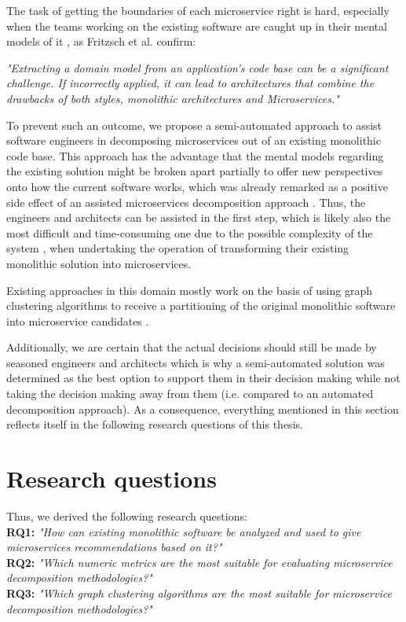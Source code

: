 \documentclass[12pt,a4paper]{report}
\begin{document}
The task of getting the boundaries of each microservice right is hard,
especially when the teams working on the existing software
are caught up in their mental models of it \cite{latoza2006maintaining},
as Fritzsch et al. confirm:
\begin{displayquote}
\emph{"Extracting a domain model from an application's code base
can be a significant challenge. If incorrectly applied,
it can lead to architectures that combine the drawbacks of both styles,
monolithic architectures and Microservices."}~\cite{fritzsch2018monolith}
\end{displayquote}
To prevent such an outcome, we propose a semi-automated approach to assist
software engineers in decomposing microservices out of an existing monolithic code base.
This approach has the advantage that the mental models regarding the existing
solution might be broken apart partially to offer new perspectives onto how
the current software works, which was already remarked as a positive side effect
of an assisted microservices decomposition approach \cite{gysel2016service}.
Thus, the engineers and architects can be assisted in the first step,
which is likely also the most difficult and time-consuming one due to the possible
complexity of the system \cite{fritzsch2018monolith, france2007model},
when undertaking the operation of transforming their existing
monolithic solution into microservices.

Existing approaches in this domain mostly work on the basis of using graph
clustering algorithms to receive a partitioning of the original monolithic
software into microservice candidates \cite{fritzsch2018monolith}.

Additionally, we are certain that the actual decisions should still be made
by seasoned engineers and architects which is why a semi-automated solution
was determined as the best option to support them in their
decision making while not taking the decision making away from them
(i.e. compared to an automated decomposition approach).
As a consequence, everything mentioned in this section reflects itself in
the following research questions of this thesis.



\section{Research questions}

\hangindent=1cm
\noindent Thus, we derived the following research questions:\\
\textbf{RQ1:} \textit{"How can existing monolithic software be analyzed
and used to give microservices recommendations based on it?"}\\
\textbf{RQ2:} \textit{"Which numeric metrics are the most suitable
for evaluating microservice decomposition methodologies?"}\\
\textbf{RQ3:} \textit{"Which graph clustering algorithms are the most suitable
for microservice decomposition methodologies?"}
\end{document}
